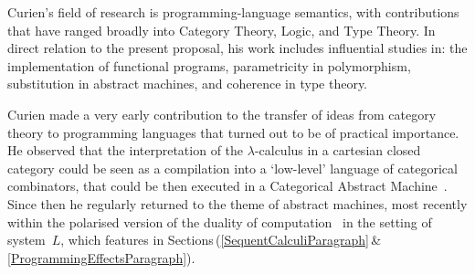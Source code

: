 \documentclass[11pt,twocolumn]{article}
\newcommand{\hide}[1]{}
\newcommand{\SysL}{$L$}%
\begin{document}
Curien's field of research is programming-language semantics, with
contributions that have ranged broadly into Category Theory, Logic, and
Type Theory.  In direct relation to the present proposal, his work
includes influential studies in:
%
%
the implementation of functional programs,
%
parametricity in polymorphism,
%
substitution in abstract machines,
%
and 
%
coherence in type theory.

%
%
Curien %
made a very early contribution to the transfer of ideas from category
theory to programming languages that turned out to be of practical
importance.  He observed that the interpretation of the
\mbox{$\lambda$-calculus} in a cartesian closed category could be seen as
a compilation into a `low-level' language of categorical combinators, that
could be then executed in a Categorical Abstract Machine~\cite{CAM}.
%
Since then he regularly returned to the theme of abstract
machines, most recently within the polarised version of the duality of
computation~\cite{CurienMunch} in the setting of system~{\SysL}, which
features in Sections\,(\ref{SequentCalculiParagraph}\,\&\,%
\ref{ProgrammingEffectsParagraph}).

\hide{
Curien has been following developments in 
higher-dimensional category theory and al\-ge\-bra\-ic operads; and he 
is now interested in higher-dimensional rewriting.  These topics intersect
the proposal at various points of
\mbox{Sections\,(\ref{AlgebraicTypeTheoryParagraph}},\,%
\mbox{\ref{IntensionalTypeTheoryParagraph}},\,\&\,%
\mbox{\ref{DirectedTypeTheoryParagraph}}).
}

\end{document}
